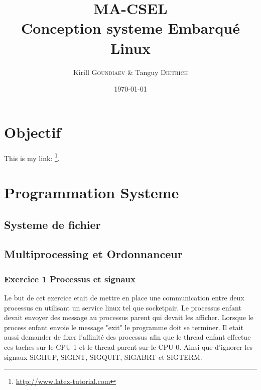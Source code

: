 \documentclass[
	a4paper, %
	10pt, %
]{CSUniSchoolLabReport}
\title{MA-CSEL \\ Conception systeme Embarqué Linux } %
\author{Kirill \textsc{Goundiaev} \& Tanguy \textsc{Dietrich}} %
\date{\today} %
\begin{document}
\maketitle %

\begin{figure}[H] %
\label{fig:speciation}
\end{figure}


\newpage

\tableofcontents
\newpage


\section{Objectif}

This is my link: \footnote{\href{http://www.latex-tutorial.com}{http://www.latex-tutorial.com}}.

\section{Programmation Systeme}

\subsection{Systeme de fichier}\label{filesystem}

\subsection{Multiprocessing et Ordonnanceur}\label{multiprocess}
\subsubsection{Exercice 1 Processus et signaux}\label{MPEx1}
Le but de cet exercice etait de mettre en place une communication entre deux processus en utilisant un service linux tel que socketpair.
Le processus enfant devait envoyer des message au processus parent qui devait les afficher. Lorsque le process enfant envoie le message "exit" le programme doit se terminer.
Il etait aussi demander de fixer l'affinité des processus afin que le thread enfant effectue ces taches sur le CPU 1 et le thread parent sur le CPU 0.
Ainsi que d'ignorer les signaux SIGHUP, SIGINT, SIGQUIT, SIGABRT et SIGTERM.\\
\end{document}
